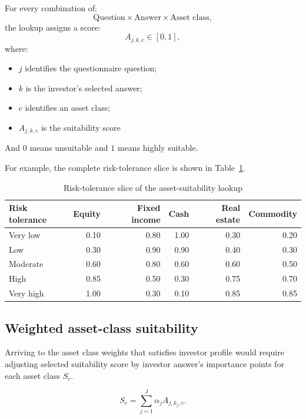 \documentclass[11pt,a4paper]{article}
\begin{document}
For every combination of:
\[
  \text{Question} \times \text{Answer} \times \text{Asset class},
\]
the lookup assigns a score:
\[
  A_{j,k,c}\in[0,1],
\]
where:
\begin{itemize}
  \item \(j\) identifies the questionnaire question;
  \item \(k\) is the investor's selected answer;
  \item \(c\) identifies an asset class;
  \item \(A_{j,k,c}\) is the suitability score

\end{itemize}

And \(0\) means unsuitable and \(1\) means highly suitable.

For example, the complete risk-tolerance slice is shown in Table~\ref{tab:risk-tolerance-suitability}.

\begin{table}[H]
  \centering
  \caption{Risk-tolerance slice of the asset-suitability lookup}
  \label{tab:risk-tolerance-suitability}
  \begin{tabular}{lrrrrr}
    \toprule
    Risk tolerance & Equity & Fixed income & Cash & Real estate & Commodity \\
    \midrule
    Very low & 0.10 & 0.80 & 1.00 & 0.30 & 0.20 \\
    Low & 0.30 & 0.90 & 0.90 & 0.40 & 0.30 \\
    Moderate & 0.60 & 0.80 & 0.60 & 0.60 & 0.50 \\
    High & 0.85 & 0.50 & 0.30 & 0.75 & 0.70 \\
    Very high & 1.00 & 0.30 & 0.10 & 0.85 & 0.85 \\
    \bottomrule
  \end{tabular}
\end{table}

\subsection{Weighted asset-class suitability}

Arriving to the asset class weights that satisfies investor profile would require adjusting selected suitability score by investor answer's importance points for each asset class $S_c$.

\begin{equation}
  S_c=\sum_{j=1}^{J}\alpha_jA_{j,k_j,c}.
\end{equation}
\end{document}
